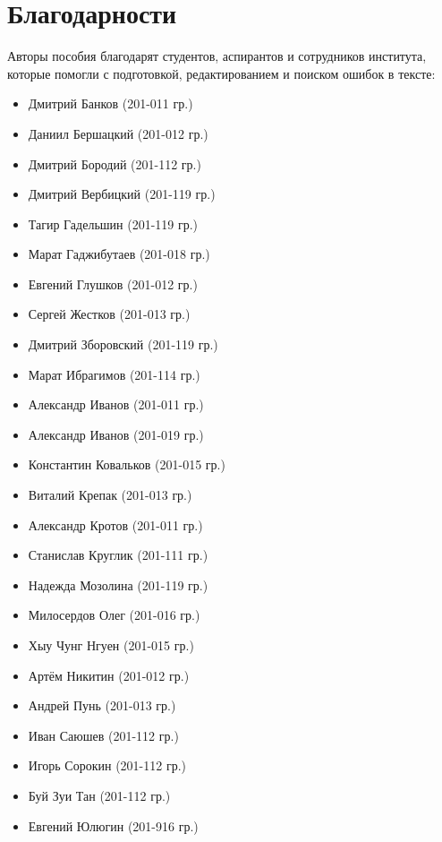 \section*{Благодарности}
Авторы пособия благодарят студентов, аспирантов и сотрудников института, которые помогли с подготовкой, редактированием и поиском ошибок в тексте:

\begin{itemize}
	\item Дмитрий Банков (201-011 гр.)
	\item Даниил Бершацкий (201-012 гр.)
	\item Дмитрий Бородий (201-112 гр.)
	\item Дмитрий Вербицкий (201-119 гр.)
	\item Тагир Гадельшин (201-119 гр.)
	\item Марат Гаджибутаев (201-018 гр.)
	\item Евгений Глушков (201-012 гр.)
	\item Сергей Жестков (201-013 гр.)
	\item Дмитрий Зборовский (201-119 гр.)
	\item Марат Ибрагимов (201-114 гр.)
	\item Александр Иванов (201-011 гр.)
	\item Александр Иванов (201-019 гр.)
	\item Константин Ковальков (201-015 гр.)
	\item Виталий Крепак (201-013 гр.)
	\item Александр Кротов (201-011 гр.)
	\item Станислав Круглик (201-111 гр.)
	\item Надежда Мозолина (201-119 гр.)
	\item Милосердов Олег (201-016 гр.)
	\item Хыу Чунг Нгуен (201-015 гр.)
	\item Артём Никитин (201-012 гр.)
	\item Андрей Пунь (201-013 гр.)
	\item Иван Саюшев (201-112 гр.)
	\item Игорь Сорокин (201-112 гр.)
	\item Буй Зуи Тан (201-112 гр.)
	\item Евгений Юлюгин (201-916 гр.)
\end{itemize}
